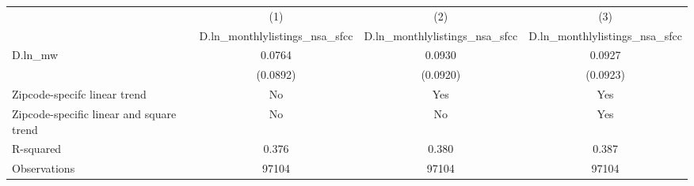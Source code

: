 {
\def\sym#1{\ifmmode^{#1}\else\(^{#1}\)\fi}
\begin{tabular}{l*{3}{c}}
\hline\hline
          &\multicolumn{1}{c}{(1)}&\multicolumn{1}{c}{(2)}&\multicolumn{1}{c}{(3)}\\
          &\multicolumn{1}{c}{D.ln\_monthlylistings\_nsa\_sfcc}&\multicolumn{1}{c}{D.ln\_monthlylistings\_nsa\_sfcc}&\multicolumn{1}{c}{D.ln\_monthlylistings\_nsa\_sfcc}\\
\hline
D.ln\_mw   &   0.0764         &   0.0930         &   0.0927         \\
          & (0.0892)         & (0.0920)         & (0.0923)         \\
\hline
Zipcode-specifc linear trend&       No         &      Yes         &      Yes         \\
Zipcode-specific linear and square trend&       No         &       No         &      Yes         \\
R-squared &    0.376         &    0.380         &    0.387         \\
Observations&    97104         &    97104         &    97104         \\
\hline\hline
\end{tabular}
}
